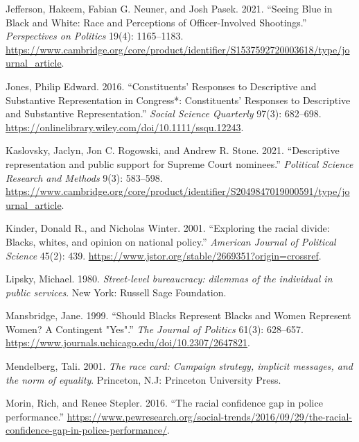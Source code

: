 \documentclass[
  12pt,
]{article}
\newlength{\cslhangindent}
\newlength{\cslentryspacingunit} %
\newenvironment{CSLReferences}[2] %
 {%
  \setlength{\parindent}{0pt}
  \ifodd #1
  \let\oldpar\par
  \def\par{\hangindent=\cslhangindent\oldpar}
  \fi
  \setlength{\parskip}{#2\cslentryspacingunit}
 }%
 {}
\begin{document}
\begin{CSLReferences}{1}{0}
\leavevmode{}%
Jefferson, Hakeem, Fabian G. Neuner, and Josh Pasek. 2021. {``Seeing
Blue in Black and White: Race and Perceptions of Officer-Involved
Shootings.''} \emph{Perspectives on Politics} 19(4): 1165--1183.
\url{https://www.cambridge.org/core/product/identifier/S1537592720003618/type/journal_article}.

\leavevmode{}%
Jones, Philip Edward. 2016. {``Constituents' Responses to Descriptive
and Substantive Representation in Congress*: Constituents' Responses to
Descriptive and Substantive Representation.''} \emph{Social Science
Quarterly} 97(3): 682--698.
\url{https://onlinelibrary.wiley.com/doi/10.1111/ssqu.12243}.

\leavevmode{}%
Kaslovsky, Jaclyn, Jon C. Rogowski, and Andrew R. Stone. 2021.
{``Descriptive representation and public support for Supreme Court
nominees.''} \emph{Political Science Research and Methods} 9(3):
583--598.
\url{https://www.cambridge.org/core/product/identifier/S2049847019000591/type/journal_article}.

\leavevmode{}%
Kinder, Donald R., and Nicholas Winter. 2001. {``Exploring the racial
divide: Blacks, whites, and opinion on national policy.''}
\emph{American Journal of Political Science} 45(2): 439.
\url{https://www.jstor.org/stable/2669351?origin=crossref}.

\leavevmode{}%
Lipsky, Michael. 1980. \emph{Street-level bureaucracy: dilemmas of the
individual in public services}. New York: Russell Sage Foundation.

\leavevmode{}%
Mansbridge, Jane. 1999. {``Should Blacks Represent Blacks and Women
Represent Women? A Contingent {"}Yes{"}.''} \emph{The Journal of
Politics} 61(3): 628--657.
\url{https://www.journals.uchicago.edu/doi/10.2307/2647821}.

\leavevmode{}%
Mendelberg, Tali. 2001. \emph{The race card: Campaign strategy, implicit
messages, and the norm of equality}. Princeton, N.J: Princeton
University Press.

\leavevmode{}%
Morin, Rich, and Renee Stepler. 2016. {``The racial confidence gap in
police performance.''}
\url{https://www.pewresearch.org/social-trends/2016/09/29/the-racial-confidence-gap-in-police-performance/}.


\end{CSLReferences}
\end{document}

